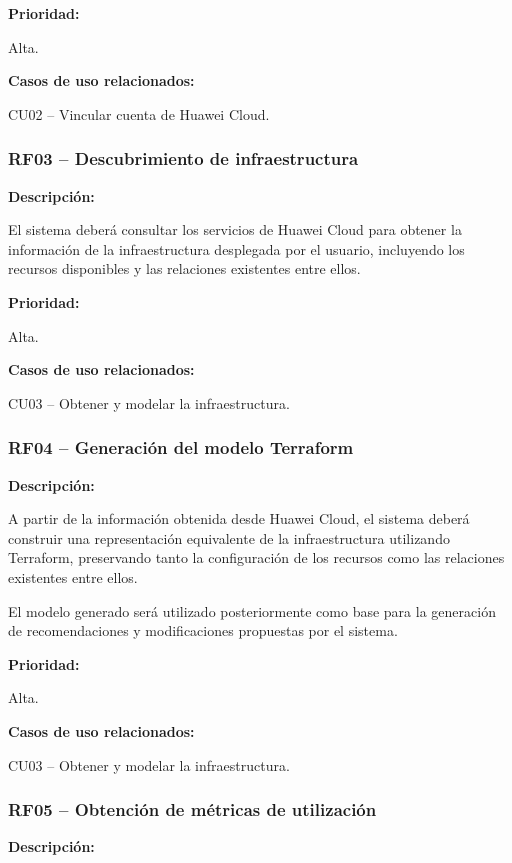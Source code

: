 \noindent \textbf{Prioridad:}

Alta.

\noindent \textbf{Casos de uso relacionados:}

\noindent CU02 -- Vincular cuenta de Huawei Cloud.

\subsubsection{RF03 -- Descubrimiento de infraestructura}

\noindent \textbf{Descripción:}

El sistema deberá consultar los servicios de Huawei Cloud para obtener la información de la infraestructura desplegada por el usuario, incluyendo los recursos disponibles y las relaciones existentes entre ellos.

\noindent \textbf{Prioridad:}

Alta.

\noindent \textbf{Casos de uso relacionados:}

\noindent CU03 -- Obtener y modelar la infraestructura.

\subsubsection{RF04 -- Generación del modelo Terraform}

\noindent \textbf{Descripción:}

A partir de la información obtenida desde Huawei Cloud, el sistema deberá construir una representación equivalente de la infraestructura utilizando Terraform, preservando tanto la configuración de los recursos como las relaciones existentes entre ellos.

El modelo generado será utilizado posteriormente como base para la generación de recomendaciones y modificaciones propuestas por el sistema.

\noindent \textbf{Prioridad:}

Alta.

\noindent \textbf{Casos de uso relacionados:}

\noindent CU03 -- Obtener y modelar la infraestructura.

\subsubsection{RF05 -- Obtención de métricas de utilización}

\noindent \textbf{Descripción:}

